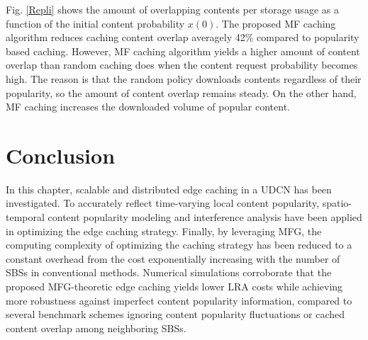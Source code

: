 \documentclass{book}
\begin{document}
            
            
            
            Fig. \ref{Repli} shows the amount of overlapping contents per storage usage as a function of the initial content probability $x(0)$. The proposed MF caching algorithm reduces caching content overlap averagely 42\% compared to popularity based caching. However, MF caching algorithm yields a higher amount of content overlap than random caching does when the content request probability becomes high. The reason is that the random policy downloads contents regardless of their  popularity, so the amount of content overlap remains steady. On the other hand, MF caching increases the downloaded volume of popular content.   
            
            
            
            
            
            
            
            \section{Conclusion}\label{Conclusion_remark}
            
            In this chapter, scalable and distributed edge caching in a UDCN has been investigated. To accurately reflect time-varying local content popularity, spatio-temporal content popularity modeling and interference analysis have been applied in optimizing the edge caching strategy. Finally, by leveraging MFG, the computing complexity of optimizing the caching strategy has been reduced to a constant overhead from the cost exponentially increasing with the number of SBSs in conventional methods. Numerical simulations corroborate that the proposed MFG-theoretic edge caching yields lower LRA costs while achieving more robustness against imperfect content popularity information, compared to several benchmark schemes ignoring content popularity fluctuations or cached content overlap among neighboring SBSs.



\end{document}
